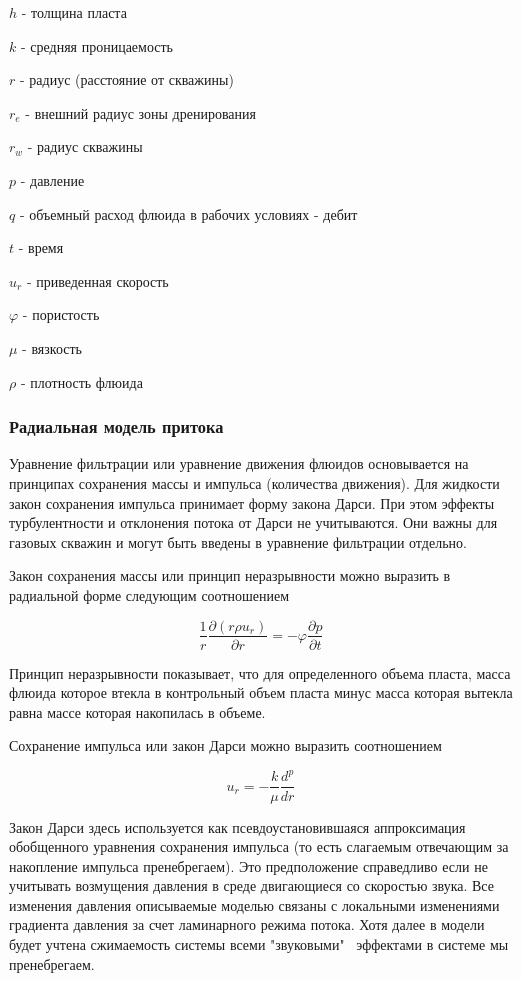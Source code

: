 \(h\) - толщина пласта

\(k\) - средняя проницаемость

\(r\) - радиус (расстояние от скважины)

\(r_e\) -  внешний радиус зоны дренирования

\(r_w\) - радиус скважины

\(p\) - давление

\(q\) - объемный расход флюида в рабочих условиях - дебит

\(t\) - время

\(u_r\) - приведенная скорость

\(\varphi\) -  пористость

\(\mu\) - вязкость

\(\rho\) - плотность флюида

\subsubsection{Радиальная модель притока}
Уравнение фильтрации или уравнение движения флюидов основывается на принципах сохранения массы и импульса (количества движения). Для жидкости закон сохранения импульса принимает форму закона Дарси. При этом эффекты турбулентности и отклонения потока от Дарси не учитываются. Они важны для газовых скважин и могут быть введены в уравнение фильтрации отдельно. 

Закон сохранения массы или принцип неразрывности можно выразить в радиальной форме следующим соотношением

\begin{equation} \label{eq:mass_balance_2}
\frac{1}{r}\frac{\partial\left(r\rho u_r\right)}{\partial r}=-\varphi\frac{\partial p}{\partial t}
\end{equation}

Принцип неразрывности показывает, что для определенного объема пласта, масса флюида которое втекла в контрольный объем пласта минус масса которая вытекла равна массе которая накопилась в объеме. 

Сохранение импульса или закон Дарси можно выразить соотношением  


\begin{equation} \label{eq:darcy_law_2}
 u_r=-\frac{k}{\mu}\frac{d^p}{dr}
\end{equation}

Закон Дарси здесь используется как псевдоустановившаяся аппроксимация обобщенного уравнения сохранения импульса (то есть слагаемым отвечающим за накопление импульса пренебрегаем). Это предположение справедливо если не учитывать возмущения давления в среде двигающиеся со скоростью звука. Все изменения давления описываемые моделью связаны с локальными изменениями градиента давления за счет ламинарного режима потока. Хотя далее в модели будет учтена сжимаемость системы всеми "звуковыми" \ эффектами в системе мы пренебрегаем.

